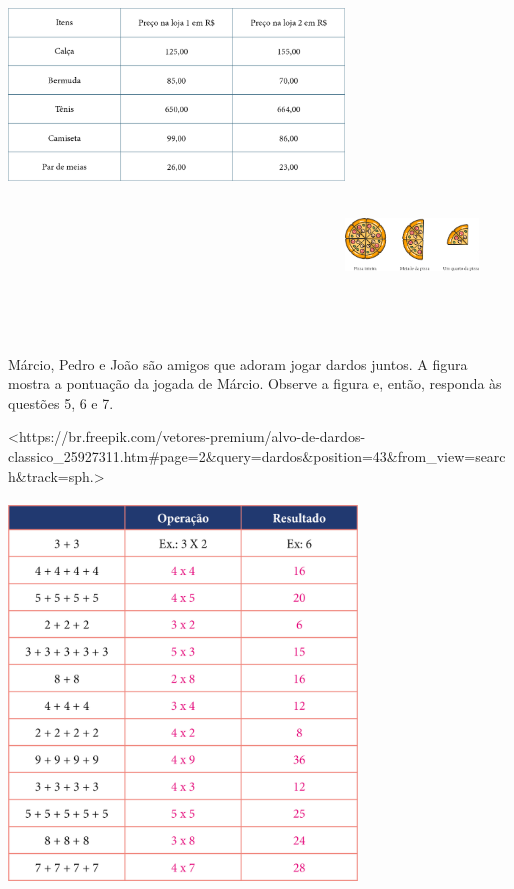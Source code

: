 \includegraphics[width=3.51191in,height=5.03125in]{media/image102.png}\includegraphics[width=1.39487in,height=1.89949in]{media/image103.png}

Márcio, Pedro e João são amigos que adoram jogar dardos juntos. A figura mostra a pontuação da jogada de Márcio. Observe a figura e, então, responda às questões 5, 6 e 7.

\textless{}https://br.freepik.com/vetores-premium/alvo-de-dardos-classico\_25927311.htm\#page=2\&query=dardos\&position=43\&from\_view=search\&track=sph.\textgreater{}

\includegraphics[width=3.64583in,height=4.02083in]{media/image104.png}


